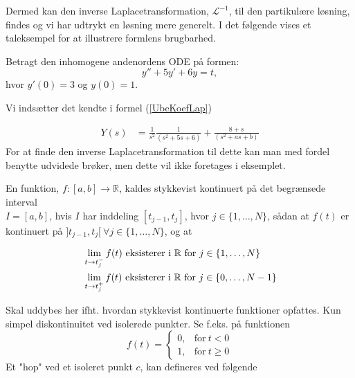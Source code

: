 Dermed kan den inverse Laplacetransformation, $\mathcal{L}^{-1}$, til den partikulære løsning, findes og vi har udtrykt en løsning mere generelt. I det følgende vises et taleksempel for at illustrere formlens brugbarhed.

\begin{Example}
\textnormal{Betragt den inhomogene andenordens ODE på formen:}
$$ y'' + 5y' + 6y = t,$$
\textnormal{hvor $y'(0) = 3$ og $y(0) = 1$.}
\hfill \break

\textnormal{Vi indsætter det kendte i formel (\ref{UbeKoefLap})}
\hfill \break

\begin{align*}
        Y(s) &= \frac{1}{s^2}\frac{1}{(s^2 + 5s + 6)} + \frac{8 + s}{(s^2 + as + b)}
\end{align*}
\textnormal{For at finde den inverse Laplacetransformation til dette kan man med fordel benytte udvidede brøker, men dette vil ikke foretages i eksemplet.}
\end{Example}

\begin{definition}\label{StykKont}
En funktion, $f:[a,b]\to \mathbb{R}$, kaldes stykkevist kontinuert på det begrænsede interval \\ $I = [a,b]$, hvis $I$ har inddeling $[t_{j-1},t_j]$, hvor $j \in \{1,\hdots, N\}$, sådan at $f(t)$ er kontinuert på $]t_{j-1},t_j[\ \forall j\in\{1,\hdots,N\}$, og at

\begin{align*}
    &\lim_{t \to t_j^{-}}f(t) \textnormal{ eksisterer i }  \mathbb{R} \textnormal{ for } j \in \{1, \hdots, N\}\\
    &\lim_{t \to t_j^{+}}f(t) \textnormal{ eksisterer i } \mathbb{R} \textnormal{ for } j \in \{0, \hdots, N-1\}
\end{align*}

\end{definition}

Skal uddybes her ifht. hvordan stykkevist kontinuerte funktioner opfattes. Kun simpel diskontinuitet ved isolerede punkter. Se f.eks. på funktionen   \begin{equation}
    f(t)=
    \begin{cases}
      0, & \text{for}\ t < 0 \\
      1, & \text{for}\ t \geq 0
    \end{cases}
  \end{equation}
Et "hop" ved et isoleret punkt $c$, kan defineres ved følgende

